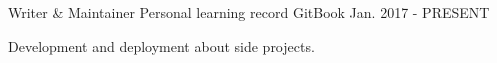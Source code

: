 

\begin{cventries}

  \cventry
    {Writer \& Maintainer} %
    {Personal learning record} %
    {GitBook} %
    {Jan. 2017 - PRESENT} %
    {
      \begin{cvitems} %
        \item {Development and deployment about side projects.}
      \end{cvitems}
    }

\end{cventries}

